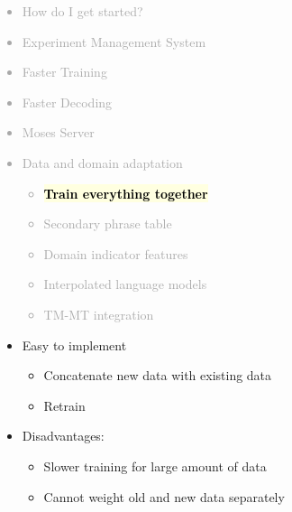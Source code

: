 \documentclass[landscape]{uedslides2C}
\newcommand{\currenttopic}[1]{\colorbox{lightyellow}{\textcolor{black}{\bf #1}}}
\begin{document}
\vspace{-5mm}
\textcolor{darkgrey}{
\begin{itemize} \itemsep -1mm
\item {How do I get started?}
\item {Experiment Management System}
\item {Faster Training}
\item {Faster Decoding}
\item {Moses Server}
\item {Data and domain adaptation}
  \begin{itemize}\vspace{-5mm}
  \item \currenttopic{Train everything together}
  \item Secondary phrase table
\item Domain indicator features
\item Interpolated language models
  \item TM-MT integration
  \end{itemize}
\end{itemize}
}


\vspace{20mm}
\begin{itemize} \itemsep 10mm
 
\item Easy to implement
  \begin{itemize}
  \item Concatenate new data with existing data
  \item Retrain
  \end{itemize}
\item Disadvantages: 
  \begin{itemize}
  \item Slower training for large amount of data
  \item Cannot weight old and new data separately
  \end{itemize}
\end{itemize}

\end{document}
